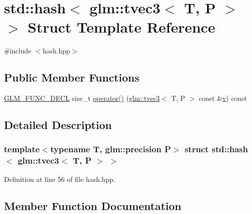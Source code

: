 \hypertarget{structstd_1_1hash_3_01glm_1_1tvec3_3_01_t_00_01_p_01_4_01_4}{}\section{std\+::hash$<$ glm\+::tvec3$<$ T, P $>$ $>$ Struct Template Reference}
\label{structstd_1_1hash_3_01glm_1_1tvec3_3_01_t_00_01_p_01_4_01_4}


{\ttfamily \#include $<$hash.\+hpp$>$}

\subsection*{Public Member Functions}
\begin{DoxyCompactItemize}
\item 
\mbox{\hyperlink{setup_8hpp_ab2d052de21a70539923e9bcbf6e83a51}{G\+L\+M\+\_\+\+F\+U\+N\+C\+\_\+\+D\+E\+CL}} size\+\_\+t \mbox{\hyperlink{structstd_1_1hash_3_01glm_1_1tvec3_3_01_t_00_01_p_01_4_01_4_af8dd018300b7f9223f6d6a1c92b0adaf}{operator()}} (\mbox{\hyperlink{structglm_1_1tvec3}{glm\+::tvec3}}$<$ T, P $>$ const \&\mbox{\hyperlink{glad_8h_a14cfbe2fc2234f5504618905b69d1e06}{v}}) const
\end{DoxyCompactItemize}


\subsection{Detailed Description}
\subsubsection*{template$<$typename T, glm\+::precision P$>$\newline
struct std\+::hash$<$ glm\+::tvec3$<$ T, P $>$ $>$}



Definition at line 56 of file hash.\+hpp.



\subsection{Member Function Documentation}
\mbox{\label{structstd_1_1hash_3_01glm_1_1tvec3_3_01_t_00_01_p_01_4_01_4_af8dd018300b7f9223f6d6a1c92b0adaf}} 
